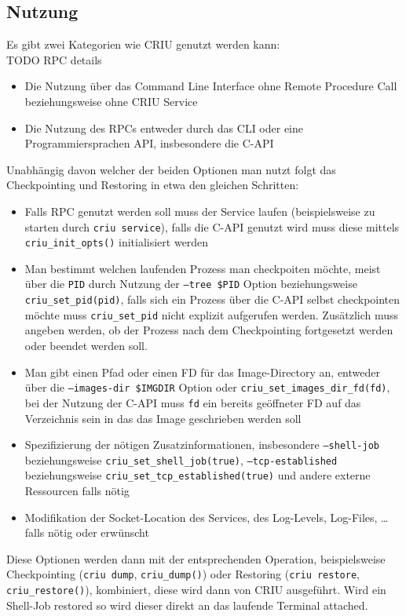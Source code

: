 \documentclass[a4paper]{article}
\begin{document}
\subsection{Nutzung}
Es gibt zwei Kategorien wie CRIU genutzt werden kann:\\
TODO RPC details
\begin{itemize}
    \item Die Nutzung über das Command Line Interface ohne Remote Procedure Call beziehungsweise ohne CRIU Service
    \item Die Nutzung des RPCs entweder durch das CLI oder eine Programmiersprachen API, insbesondere die C-API
\end{itemize}
Unabhängig davon welcher der beiden Optionen man nutzt folgt das Checkpointing und Restoring in etwa den gleichen Schritten:
\begin{itemize}
    \item Falls RPC genutzt werden soll muss der Service laufen (beispielsweise zu starten durch \texttt{criu service}), falls die C-API genutzt wird muss diese mittels \texttt{criu\_init\_opts()} initialisiert werden
    \item Man bestimmt welchen laufenden Prozess man checkpoiten möchte, meist über die \texttt{PID} durch Nutzung der \texttt{--tree \$PID} Option beziehungsweise \texttt{criu\_set\_pid(pid)}, falls sich ein Prozess über die C-API selbst checkpointen möchte muss \texttt{criu\_set\_pid} nicht explizit aufgerufen werden. Zusätzlich muss angeben werden, ob der Prozess nach dem Checkpointing fortgesetzt werden oder beendet werden soll.
    \item Man gibt einen Pfad oder einen FD für das Image-Directory an, entweder über die \texttt{--images-dir \$IMGDIR} Option oder \texttt{criu\_set\_images\_dir\_fd(fd)}, bei der Nutzung der C-API muss \texttt{fd} ein bereits geöffneter FD auf das Verzeichnis sein in das das Image geschrieben werden soll
    \item Spezifizierung der nötigen Zusatzinformationen, insbesondere \texttt{--shell-job} beziehungsweise \texttt{criu\_set\_shell\_job(true)}, \texttt{--tcp-established} beziehungsweise \texttt{criu\_set\_tcp\_established(true)} und andere externe Ressourcen falls nötig
    \item Modifikation der Socket-Location des Services, des Log-Levels, Log-Files, \dots falls nötig oder erwünscht
\end{itemize}
Diese Optionen werden dann mit der entsprechenden Operation, beispielsweise Checkpointing (\texttt{criu dump}, \texttt{criu\_dump()}) oder Restoring (\texttt{criu restore}, \texttt{criu\_restore()}), kombiniert, diese wird dann von CRIU ausgeführt. Wird ein Shell-Job restored so wird dieser direkt an das laufende Terminal attached.
\end{document}
